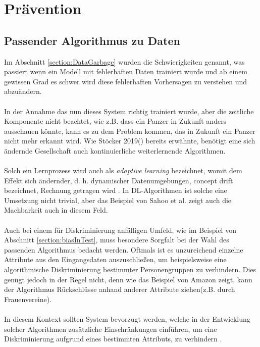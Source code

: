 \documentclass[12pt,oneside,a4paper,parskip]{scrbook}
\begin{document}
\chapter{Prävention}
\label{chapter:main}
\section{Passender Algorithmus zu Daten}

Im Abschnitt \ref{section:DataGarbage} wurden die Schwierigkeiten genannt, was passiert wenn ein Modell mit fehlerhaften Daten trainiert wurde und ab einem gewissen Grad es schwer wird diese fehlerhaften Vorhersagen zu verstehen und abzuändern.
\\\\
In der Annahme das nun dieses System richtig trainiert wurde, aber die zeitliche Komponente nicht beachtet, wie z.B. dass ein Panzer in Zukunft anders ausschauen könnte, kann es zu dem Problem kommen, das in Zukunft ein Panzer nicht mehr erkannt wird. Wie Stöcker 2019(\cite{stoecker}) bereits erwähnte, benötigt eine sich ändernde Gesellschaft auch kontinuierliche weiterlernende Algorithmen. 
\\\\
Solch ein Lernprozess wird auch als \textit{adaptive learning} bezeichnet, womit dem Effekt sich ändernder, d. h. dynamischer Datenumgebungen, concept drift bezeichnet, Rechnung getragen wird \cite{gama}. In DL-Algorithmen ist solche eine Umsetzung nicht trivial, aber das Beispiel von Sahoo et al. \cite{sahoo} zeigt auch die Machbarkeit auch in diesem Feld.
\\\\
Auch bei einem für Diskriminierung anfälligen Umfeld, wie im Beispiel von Abschnitt \ref{section:biasInTest}, muss besondere Sorgfalt bei der Wahl des passenden Algorithmus bedacht werden. Oftmals ist es unzureichend einzelne Attribute aus den Eingangsdaten auszuschließen, um beispielsweise eine algorithmische Diskriminierung bestimmter Personengruppen zu verhindern. Dies genügt jedoch in der Regel nicht, denn wie das Beispiel von Amazon zeigt, kann der Algorithmus Rückschlüsse anhand anderer Attribute ziehen(z.B. durch Frauenvereine).
\\\\
In diesem Kontext sollten System bevorzugt werden, welche in der Entwicklung solcher Algorithmen zusätzliche Einschränkungen einführen, um eine Diskriminierung aufgrund eines bestimmten Attributs, zu verhindern \cite{kamiran}.
\end{document}
